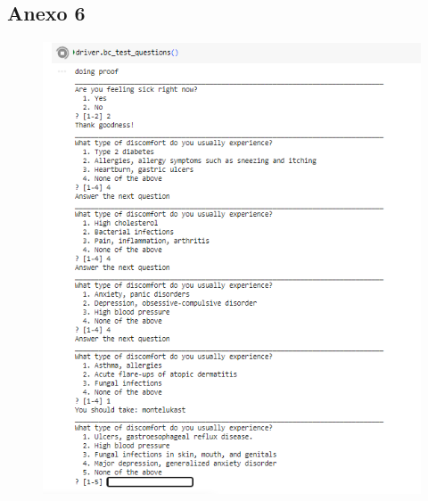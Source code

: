 \documentclass[11pt]{article}
\begin{document}
\subsection{Anexo 6}
\begin{figure}[H]
  \centering
  \includegraphics[width=\linewidth]{Graphs/imagen5.png}
  \label{fig:imagen5}
\end{figure}
\end{document}
